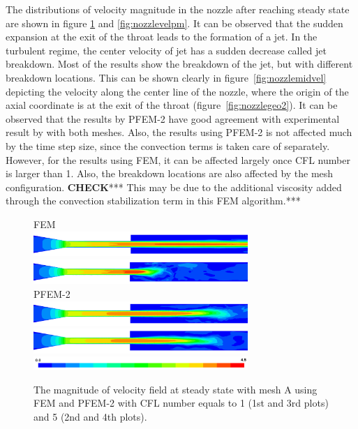 The distributions of velocity magnitude in the nozzle after reaching steady state are shown in figure \ref{fig:nozzlevelfm} and \ref{fig:nozzlevelpm}. It can be observed that the sudden expansion at the exit of the throat leads to the formation of a jet. In the turbulent regime, the center velocity of jet has a sudden decrease called jet breakdown. Most of the results show the breakdown of the jet, but with different breakdown locations. This can be shown clearly in figure~\ref{fig:nozzlemidvel} depicting the velocity along the center line of the nozzle, where the origin of the axial coordinate is at the exit of the throat (figure~\ref{fig:nozzlegeo2}). It can be observed that the results by PFEM-2 have good agreement with experimental result by \cite{hariharan_nozzle} with both meshes. Also, the results using PFEM-2 is not affected much by the time step size, since the convection terms is taken care of separately. However, for the results using FEM, it can be affected largely once CFL number is larger than 1. Also, the breakdown locations are also affected by the mesh configuration. \textbf{CHECK}*** This may be due to the additional viscosity added through the convection stabilization term in this FEM algorithm.***

\begin{figure}[htbp]
    \centering
    FEM\\
    \includegraphics[width=3.2in]{imgs/nozzle_pump/nozzle_fem_fm_cfl1.png}
    \includegraphics[width=3.2in]{imgs/nozzle_pump/nozzle_fem_fm_cfl5.png}\\
    PFEM-2\\
    \includegraphics[width=3.2in]{imgs/nozzle_pump/nozzle_pfem_fm_cfl1.png}
    \includegraphics[width=3.2in]{imgs/nozzle_pump/nozzle_pfem_fm_cfl5.png}
    \includegraphics[width=3.2in]{imgs/nozzle_pump/nozzle_legend.png}
    \caption{The magnitude of velocity field at steady state with mesh A using FEM and PFEM-2 with CFL number equals to 1 (1st and 3rd plots) and 5 (2nd and 4th plots). }
    \label{fig:nozzlevelfm}
\end{figure}

